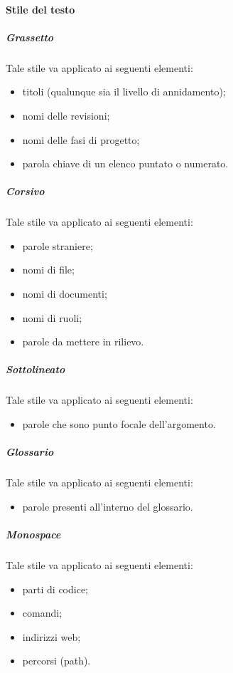 			\paragraph{Stile del testo}
				\subparagraph{Grassetto}
					Tale stile va applicato ai seguenti elementi:
					\begin{itemize}
						\item titoli (qualunque sia il livello di annidamento);
						\item nomi delle revisioni;
						\item nomi delle fasi di progetto;
						\item parola chiave di un elenco puntato o numerato.
					\end{itemize}
				\subparagraph{Corsivo}
					Tale stile va applicato ai seguenti elementi:
					\begin{itemize}
						\item parole straniere;
						\item nomi di file;
						\item nomi di documenti;
						\item nomi di ruoli;
						\item parole da mettere in rilievo.
					\end{itemize}
				\subparagraph{Sottolineato}
					Tale stile va applicato ai seguenti elementi:
					\begin{itemize}
						\item parole che sono punto focale dell’argomento.
					\end{itemize}
				\subparagraph{Glossario}
					Tale stile va applicato ai seguenti elementi:
					\begin{itemize}
						\item parole presenti all’interno del glossario.
					\end{itemize}
				\subparagraph{Monospace}
					Tale stile va applicato ai seguenti elementi:
					\begin{itemize}
						\item parti di codice;
						\item comandi;
						\item indirizzi web;
						\item percorsi (path).
					\end{itemize}
